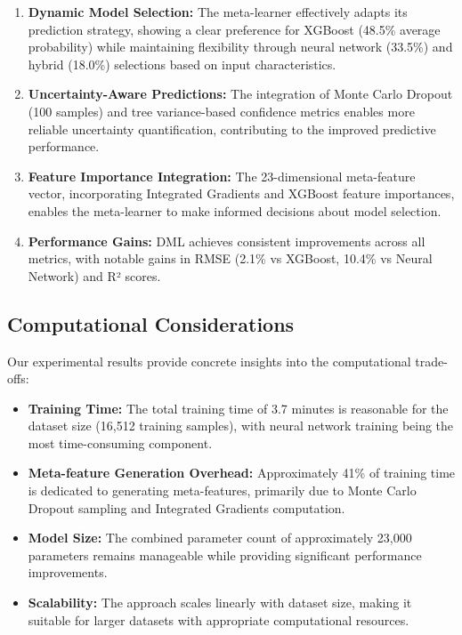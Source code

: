 \documentclass[10pt,journal,compsoc]{IEEEtran}
\begin{document}
\begin{enumerate}
    \item \textbf{Dynamic Model Selection:} The meta-learner effectively adapts its prediction strategy, showing a clear preference for XGBoost (48.5\% average probability) while maintaining flexibility through neural network (33.5\%) and hybrid (18.0\%) selections based on input characteristics.
    
    \item \textbf{Uncertainty-Aware Predictions:} The integration of Monte Carlo Dropout (100 samples) and tree variance-based confidence metrics enables more reliable uncertainty quantification, contributing to the improved predictive performance.
    
    \item \textbf{Feature Importance Integration:} The 23-dimensional meta-feature vector, incorporating Integrated Gradients and XGBoost feature importances, enables the meta-learner to make informed decisions about model selection.
    
    \item \textbf{Performance Gains:} DML achieves consistent improvements across all metrics, with notable gains in RMSE (2.1\% vs XGBoost, 10.4\% vs Neural Network) and R² scores.
\end{enumerate}

\subsection{Computational Considerations}

Our experimental results provide concrete insights into the computational trade-offs:

\begin{itemize}
    \item \textbf{Training Time:} The total training time of 3.7 minutes is reasonable for the dataset size (16,512 training samples), with neural network training being the most time-consuming component.
    
    \item \textbf{Meta-feature Generation Overhead:} Approximately 41\% of training time is dedicated to generating meta-features, primarily due to Monte Carlo Dropout sampling and Integrated Gradients computation.
    
    \item \textbf{Model Size:} The combined parameter count of approximately 23,000 parameters remains manageable while providing significant performance improvements.
    
    \item \textbf{Scalability:} The approach scales linearly with dataset size, making it suitable for larger datasets with appropriate computational resources.
\end{itemize}
\end{document}
